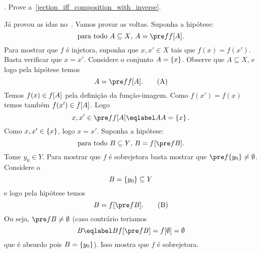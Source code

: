 \endproblem

\problem.
\label{jection_iff_composition_with_inverse_proof}%
Prove a~\ref{jection_iff_composition_with_inverse}.

\solution
Já provou as idas no~.
Vamos provar as voltas.
\endgraf
{}
Suponha a hipótese:
$$
\text{para todo $A \subseteq X$, $A = \pre f {\img f A}$}.
$$
Para mostrar que $f$ é injetora, suponha que $x,x'\in X$ tais que $f(x) = f(x')$.
Basta verificar que $x = x'$.
Considere o conjunto $A = \left\{x\right\}$.
Observe que $A \subseteq X$, e logo pela hipótese temos
$$
A = \pre f {\img f A}.\tag{A}
$$
Temos $f(x) \in f[A]$ pela definição da função-imagem.
Como $f(x') = f(x)$ temos também $f(x') \in f[A]$.
Logo
$$
x, x' \in \pre f {\img f A} \eqlabel A A = \set{x}.
$$
Como $x, x' \in \left\{x\right\}$, logo $x = x'$.
\endgraf
{}
Suponha a hipótese:
$$
\text{para todo $B \subseteq Y$, $B = \img f {\pre f B}$}.
$$
Tome $y_0\in Y$.
Para mostrar que $f$ é sobrejetora
basta mostrar que $\pre f {\set{y_0}} \neq \emptyset$.
Considere o
$$
B = \left\{y_0\right\} \subseteq Y
$$
e logo pela hipótese temos
$$
B = \img f {\pre f B}.\tag{B}
$$
Ou seja, $\pre f B \neq \emptyset$
(caso contrário teriamos
$$
B
\eqlabel B \img f {\pre f B}
= \img f {\emptyset}
= \emptyset
$$
que é absurdo pois $B = \left\{y_0\right\}$).
Isso mostra que $f$ é sobrejetora.

\endproblem

